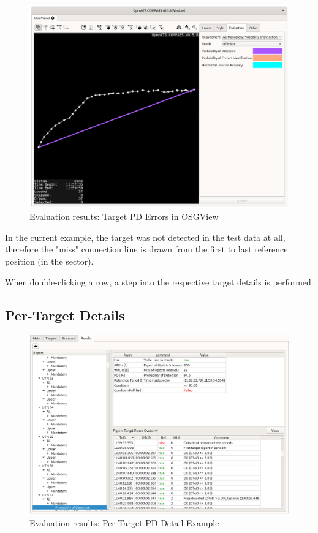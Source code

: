 \begin{figure}[H]
  \hspace*{-2.5cm}
    \includegraphics[width=19cm]{../screenshots/eval_results_pd_single_osgview.png}
  \caption{Evaluation results: Target PD Errors in OSGView}
\end{figure}

In the current example, the target was not detected in the test data at all, therefore the "miss" connection line is drawn from the first to last reference position (in the sector).

When double-clicking a row, a step into the respective target details is performed.

\subsection{Per-Target Details}

\begin{figure}[H]
  \hspace*{-2cm}
    \includegraphics[width=18cm,frame]{../screenshots/eval_results_target_det_example.png}
  \caption{Evaluation results: Per-Target PD Detail Example}
\end{figure}

